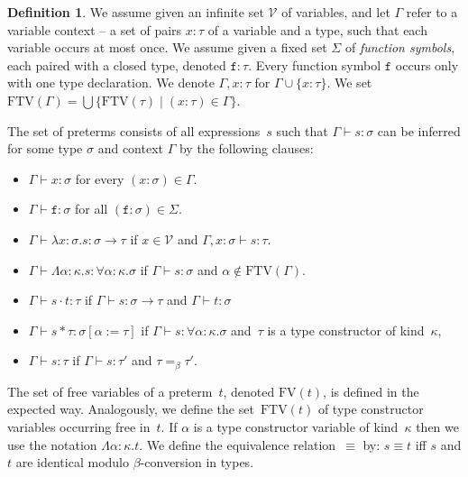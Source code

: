 \documentclass[a4paper,UKenglish,cleveref,autoref,numberwithinsect]{lipics-v2019}
\theoremstyle{definition}
\newtheorem{defn}[theorem]{Definition}
\newcommand{\Vars}{\mathcal{V}}
\newcommand{\arrtype}{\rightarrow}
\newcommand{\quant}[2]{\forall #1.#2}
\newcommand{\app}[2]{#1 \cdot #2}
\newcommand{\tapp}[2]{#1 * #2}
\newcommand{\subst}[2]{#1:=#2}
\newcommand{\abs}[2]{\lambda #1.#2}
\newcommand{\tabs}[2]{\Lambda #1.#2}
\newcommand{\FTV}{\mathrm{FTV}}
\newcommand{\FV}{\mathrm{FV}}
\begin{document}
\begin{defn}\label{def_preterms}
  We assume given an infinite set $\Vars$ of variables, and let
  $\Gamma$ refer to a variable context -- a set of pairs $x : \tau$ of
  a variable and a type, such that each variable occurs at most
  once. We assume given a fixed set $\Sigma$ of \emph{function
    symbols}, each paired with a closed type, denoted $\mathtt{f} :
  \tau$.  Every function symbol $\mathtt{f}$ occurs only with one type
  declaration. We denote $\Gamma,x:\tau$ for $\Gamma \cup \{x:\tau\}$. We
\pagebreak
  set $\FTV(\Gamma) = \bigcup\{\FTV(\tau) \mid (x : \tau) \in
  \Gamma\}$.

  The set of preterms consists of all expressions~$s$ such that
  $\Gamma \vdash s : \sigma$ can be inferred for some type $\sigma$
  and context $\Gamma$ by the following clauses:
  \begin{itemize}
  \item $\Gamma \vdash x : \sigma$ for every $(x : \sigma) \in \Gamma$.
  \item $\Gamma \vdash \mathtt{f} : \sigma$ for all
    $(\mathtt{f} : \sigma) \in \Sigma$.
  \item $\Gamma \vdash \abs{x:\sigma}{s} : \sigma \arrtype \tau$ if $x
    \in \Vars$ and $\Gamma, x : \sigma \vdash s : \tau$.
  \item $\Gamma \vdash \tabs{\alpha:\kappa}{s} : \quant{\alpha:\kappa}{\sigma}$ if
    $\Gamma \vdash s : \sigma$ and $\alpha \notin \FTV(\Gamma)$.
  \item $\Gamma \vdash \app{s}{t} : \tau$ if $\Gamma \vdash s : \sigma
    \arrtype \tau$ and $\Gamma \vdash t : \sigma$
  \item $\Gamma \vdash \tapp{s}{\tau} : \sigma[\subst{\alpha}{\tau}]$
    if $\Gamma \vdash s : \quant{\alpha:\kappa}{\sigma}$ and~$\tau$ is
    a type constructor of kind~$\kappa$,
  \item $\Gamma \vdash s : \tau$ if $\Gamma \vdash s : \tau'$ and
    $\tau =_\beta \tau'$.
  \end{itemize}
  The set of free variables of a preterm~$t$, denoted $\FV(t)$, is
  defined in the expected way. Analogously, we define the
  set~$\FTV(t)$ of type constructor variables occurring free
  in~$t$.
  If $\alpha$ is a type constructor variable of
  kind~$\kappa$ then we use the notation $\tabs{\alpha:\kappa}{t}$.
  We define the equivalence relation~$\equiv$ by: $s \equiv t$ iff $s$
  and $t$ are identical modulo $\beta$-conversion in types.
\end{defn}
\end{document}
